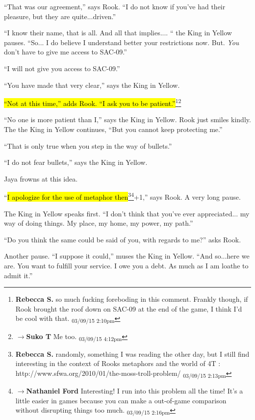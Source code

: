 ``That was our agreement,'' says Rook. ``I do not know if you've had their pleasure, but they are quite...driven.''

``I know their name, that is all.  And all that implies.... ``  the King in Yellow pauses. ``So... I do believe I understand better your restrictions now.  But.  \textit{You} don't have to give me access to SAC-09.''

``I will not give you access to SAC-09.''

``You have made that very clear,'' says the King in Yellow.

\hl{``Not at this time,'' adds Rook.  ``I ask you to be patient.''}\footnote{\textbf{Rebecca S. }so much fucking foreboding in this comment.  Frankly though, if Rook brought the roof down on SAC-09 at the end of the game, I think I'd be cool with that. \textsubscript{03/09/15 2:10pm}}\footnote{$\rightarrow$\textbf{Suko T }Me too. \textsubscript{03/09/15 4:12pm}}

``No one is more patient than I,'' says the King in Yellow.  Rook just smiles kindly.  The the King in Yellow continues, ``But you cannot keep protecting me.''

``That is only true when you step in the way of bullets.''

``I do not fear bullets,'' says the King in Yellow.

Jaya frowns at this idea.

``\hl{I apologize for the use of metaphor then}\footnote{\textbf{Rebecca S. }randomly, something I was reading the other day, but I still find interesting in the context of Rooks metaphors and the world of 4T : http://www.sfwa.org/2010/01/the-moss-troll-problem/ \textsubscript{03/09/15 2:13pm}}\footnote{$\rightarrow$\textbf{Nathaniel Ford }Interesting! I run into this problem all the time! It's a little easier in games because you can make a out-of-game comparison without disrupting things too much. \textsubscript{03/09/15 2:16pm}}+1,'' says Rook.  A very long pause.

The King in Yellow speaks first.  ``I don't think that you've ever appreciated... my way of doing things.  My place, my home, my power, my path.''

``Do you think the same could be said of you, with regards to me?'' asks Rook.

Another pause.  ``I suppose it could,'' muses the King in Yellow.  ``And so...here we are. You want to fulfill your service.  I owe you a debt.  As much as I am loathe to admit it.''

